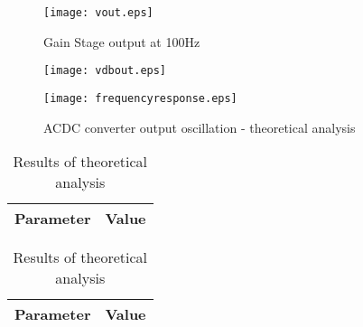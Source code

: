 \begin{figure}[h] \centering
\texttt{[image: vout.eps]}
\vspace{-5mm}
\caption{Gain Stage output at 100Hz}
\label{fig:vout}
\end{figure}

\begin{figure}[h] \centering
  \begin{minipage}{.45\textwidth}
    \texttt{[image: vdbout.eps]}
    \caption{ACDC converter output oscillation - theoretical analysis}
    \label{fig:vdbout}
  \end{minipage}%
    \hspace{2 mm}
  \begin{minipage}{.45\textwidth}
  \centering
    \texttt{[image: frequencyresponse.eps]}
    \caption{ACDC converter output oscillation - theoretical analysis}
    \label{fig:compvdbout}
      \end{minipage}%
\end{figure}

\begin{table}[!htb]
  \begin{minipage}{.5\linewidth}
     \centering
  \begin{tabular}{|c|c|}
    \hline    
    {\bf Parameter} & {\bf Value} \\ \hline
    
    
 \end{tabular}
 \caption{Results of simulation analysis}
 \label{tab:z}
  \end{minipage}
    \hspace{2 mm}
    \begin{minipage}{.5\linewidth}
      \centering
        \begin{tabular}{|c|c|}
    \hline    
    {\bf Parameter} & {\bf Value} \\ \hline
     
 \end{tabular}
        \caption{Results of theoretical analysis}
        \label{tab:compz}
    \end{minipage} 
\end{table}


\newpage
